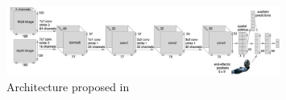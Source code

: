 \begin{figure}[htb]
    \centering
    \includegraphics[width=0.8\textwidth]{Figures/images/deep_imitation_bc/deep_imitation_bc.jpg}
    \caption{Architecture proposed in \cite{zhang2018deep_vr_teleoperation}}
    \label{fig:deep_bc}
\end{figure}

